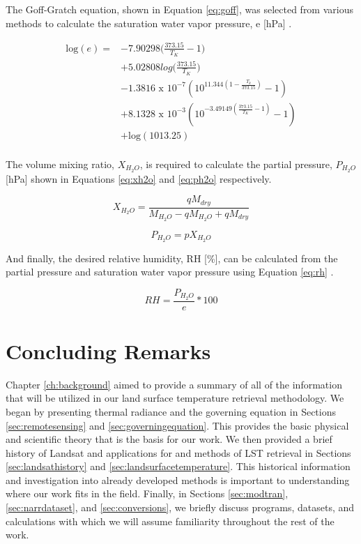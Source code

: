 \documentclass{book}
\begin{document}
The Goff-Gratch equation, shown in Equation \ref{eq:goff}, was selected from various methods to calculate the saturation water vapor pressure, e [hPa] \cite{goff_1946}.

\begin{equation}
\begin{split}
\mbox{log}(e) = & -7.90298\bigg(\frac{373.15}{T_K} - 1\bigg) \\
           & + 5.02808 log\bigg(\frac{373.15}{T_K}\bigg) \\
           & - 1.3816\mbox{ x }10^{-7}(10^{11.344(1-\frac{T_k}{373.15})}-1) \\ 
           & + 8.1328\mbox{ x }10^{-3}(10^{-3.49149(\frac{373.15}{T_K}-1)}-1) \\
           & + \mbox{log}(1013.25) \\
\end{split}
\label{eq:goff}
\end{equation}

The volume mixing ratio, $X_{H_2O}$, is required to calculate the partial pressure, $P_{H_2O}$ [hPa] shown in Equations \ref{eq:xh2o} and \ref{eq:ph2o} respectively.

\begin{equation}
X_{H_2O} = \frac{{q}{M_{dry}}}{M_{H_2O}-{q}{M_{H_2O}}+{q}{M_{dry}}}
\label{eq:xh2o}
\end{equation}

\begin{equation}
P_{H_2O} = pX_{H_2O}
\label{eq:ph2o}
\end{equation}

And finally, the desired relative humidity, RH [\%], can be calculated from the partial pressure and saturation water vapor pressure using Equation \ref{eq:rh} \cite{kruger_2010}.

\begin{equation}
RH = \frac{P_{H_2O}}{e}*100
\label{eq:rh}
\end{equation}

\section{Concluding Remarks}

Chapter \ref{ch:background} aimed to provide a summary of all of the information that will be utilized in our land surface temperature retrieval methodology.  We began by presenting thermal radiance and the governing equation in Sections \ref{sec:remotesensing} and \ref{sec:governingequation}.  This provides the basic physical and scientific theory that is the basis for our work.  We then provided a brief history of Landsat and applications for and methods of LST retrieval in Sections \ref{sec:landsathistory} and \ref{sec:landsurfacetemperature}.  This historical information and investigation into already developed methods is important to understanding where our work fits in the field.  Finally, in Sections \ref{sec:modtran}, \ref{sec:narrdataset}, and \ref{sec:conversions}, we briefly discuss programs, datasets, and calculations with which we will assume familiarity throughout the rest of the work.
\end{document}
